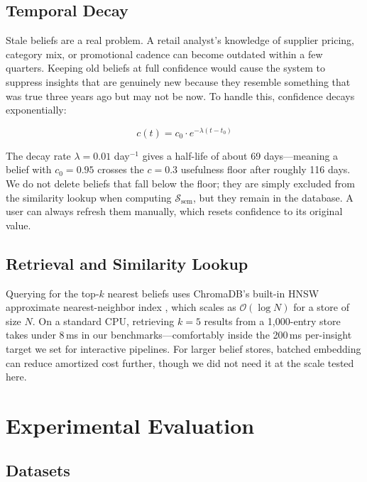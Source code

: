 \documentclass[conference]{IEEEtran}
\begin{document}
\subsection{Temporal Decay}

Stale beliefs are a real problem. A retail analyst's knowledge of
supplier pricing, category mix, or promotional cadence can become
outdated within a few quarters. Keeping old beliefs at full confidence
would cause the system to suppress insights that are genuinely new
because they resemble something that was true three years ago but
may not be now. To handle this, confidence decays exponentially:

\begin{equation}
  c(t) = c_0 \cdot e^{-\lambda(t - t_0)}
  \label{eq:decay}
\end{equation}

The decay rate $\lambda = 0.01$ day$^{-1}$ gives a half-life of
about 69 days---meaning a belief with $c_0 = 0.95$ crosses the
$c = 0.3$ usefulness floor after roughly 116 days. We do not
delete beliefs that fall below the floor; they are simply excluded
from the similarity lookup when computing $\mathcal{S}_{\text{sem}}$,
but they remain in the database. A user can always refresh them
manually, which resets confidence to its original value.

\subsection{Retrieval and Similarity Lookup}

Querying for the top-$k$ nearest beliefs uses ChromaDB's built-in
HNSW approximate nearest-neighbor index \cite{malkov2018efficient},
which scales as $\mathcal{O}(\log N)$ for a store of size $N$.
On a standard CPU, retrieving $k=5$ results from a 1,000-entry
store takes under 8\,ms in our benchmarks---comfortably inside the
200\,ms per-insight target we set for interactive pipelines.
For larger belief stores, batched embedding can reduce amortized
cost further, though we did not need it at the scale tested here.

\section{Experimental Evaluation}
\label{sec:eval}

\subsection{Datasets}
\end{document}
